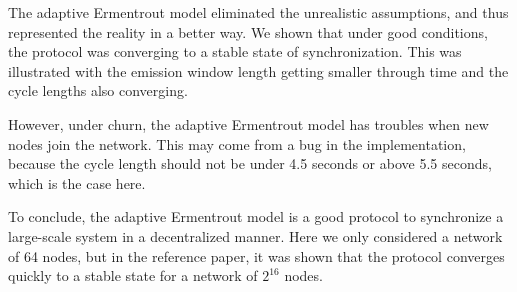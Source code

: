 \documentclass[a4paper, 11pt]{article}
\theoremstyle{plain}
\theoremstyle{definition}
\begin{document}
  The adaptive Ermentrout model eliminated the unrealistic assumptions, and thus represented the reality in a
  better way. We shown that under good conditions, the protocol was converging to a stable state of
  synchronization. This was illustrated with the emission window length getting smaller through time and the
  cycle lengths also converging.

  However, under churn, the adaptive Ermentrout model has troubles when new nodes join the network. This may
  come from a bug in the implementation, because the cycle length should not be under 4.5 seconds or above 5.5
  seconds, which is the case here.

  To conclude, the adaptive Ermentrout model is a good protocol to synchronize a large-scale system in a
  decentralized manner. Here we only considered a network of 64 nodes, but in the reference paper, it was
  shown that the protocol converges quickly to a stable state for a network of $2^{16}$ nodes. 


    
    
    












	
\end{document}

